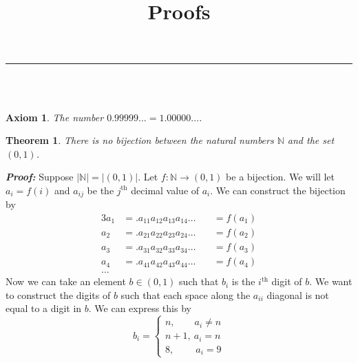 \documentclass{article}
\title{Proofs}
\date{}
\newcommand{\NN}{\mathbb{N}}
\newcommand{\Proof}{\textit{\textbf{Proof: }}}
\newcommand{\scc}{\begin{cases*}}
\newcommand{\ecc}{\end{cases*}}
\newtheorem{theorem}{Theorem}
\newtheorem{axiom}{Axiom}
\begin{document}
\maketitle
\hrule
\noindent\\\\
\begin{axiom}
The number $0.99999... = 1.00000...$.
\end{axiom}
\begin{theorem}
There is no bijection between the natural numbers $\NN$ and the set $(0,1)$.
\end{theorem}
\noindent
\indent \Proof Suppose $|\NN| = |(0,1)|$. 
Let $f : \NN \to (0,1)$ be a bijection. 
We will let $a_{i} = f(i)$ and $a_{ij}$ be the $j^{\text{th}}$ decimal value of $a_{i}$. 
We can construct the bijection by
\begin{alignat*}{3}
a_{1} &= .a_{11}a_{12}a_{13}a_{14}\dots\ &&= f(a_{1})\\
a_{2} &= .a_{21}a_{22}a_{23}a_{24}\dots &&= f(a_{2})\\
a_{3} &= .a_{31}a_{32}a_{33}a_{34}\dots &&= f(a_{3})\\
a_{4} &= .a_{41}a_{42}a_{43}a_{44}\dots &&= f(a_{4})\\
\dots
\end{alignat*}
Now we can take an element $b \in (0,1)$ such that $b_{i}$ is the $i^{\text{th}}$ digit of $b$. 
We want to construct the digits of $b$ such that each space along the $a_{ii}$ diagonal is not equal to a digit in $b$. We can express this by
\[
b_{i} = 
\scc
n,\qquad a_{i} \neq n\\
n+1,\ a_{i} = n\\
8,\qquad\ a_{i} = 9
\ecc
\]
\end{document}
